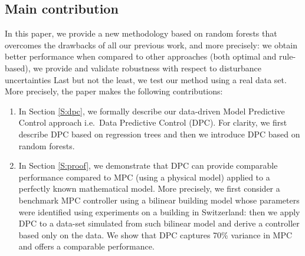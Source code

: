 \textcolor[rgb]{0,0,1}{
\subsection{Main contribution}
In this paper, we provide a new methodology based on random forests that overcomes the drawbacks of all our previous work, and more precisely: we obtain better performance when compared to other approaches (both optimal and rule-based), we provide and validate robustness with respect to disturbance uncertainties
Last but not the least, we test our method using a real data set. 
More precisely, the paper makes the following contributions:
\begin{enumerate}
	\item In Section \ref{S:dpc}, we formally describe our data-driven Model Predictive Control approach i.e.~Data Predictive Control (DPC). For clarity, we first describe DPC based on regression trees and then we introduce DPC based on random forests.
	\item In Section \ref{S:proof}, we demonstrate that DPC can provide comparable performance compared to MPC (using a physical model) applied to a perfectly known mathematical model. More precisely, we first consider a benchmark MPC controller using a bilinear building model whose parameters were identified using experiments on a building in Switzerland: then we apply DPC to a data-set simulated from such bilinear model and derive a controller based only on the data. We show that DPC captures 70\% variance in MPC and offers a comparable performance.

\end{enumerate}}

